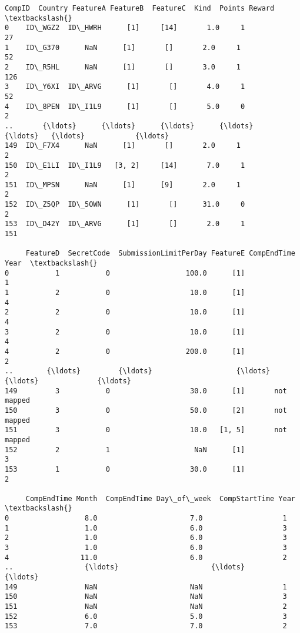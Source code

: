 \documentclass{report}
\makeatletter
\newcommand{\boxspacing}{\kern\kvtcb@left@rule\kern\kvtcb@boxsep}
\newcommand{\prompt}[4]{
        \ttfamily\llap{{\color{#2}[#3]:\hspace{3pt}#4}}\vspace{-\baselineskip}
    }
\makeatother
\begin{document}
            \begin{tcolorbox}[breakable, size=fbox, boxrule=.5pt, pad at break*=1mm, opacityfill=0]
\prompt{Out}{outcolor}{156}{\boxspacing}
\begin{Verbatim}[commandchars=\\\{\}]
      CompID  Country FeatureA FeatureB  FeatureC  Kind  Points Reward  \textbackslash{}
0    ID\_WGZ2  ID\_HWRH      [1]     [14]       1.0     1             27
1    ID\_G370      NaN      [1]       []       2.0     1             52
2    ID\_R5HL      NaN      [1]       []       3.0     1            126
3    ID\_Y6XI  ID\_ARVG      [1]       []       4.0     1             52
4    ID\_8PEN  ID\_I1L9      [1]       []       5.0     0              2
..       {\ldots}      {\ldots}      {\ldots}      {\ldots}       {\ldots}   {\ldots}            {\ldots}
149  ID\_F7X4      NaN      [1]       []       2.0     1              2
150  ID\_E1LI  ID\_I1L9   [3, 2]     [14]       7.0     1              2
151  ID\_MPSN      NaN      [1]      [9]       2.0     1              2
152  ID\_Z5QP  ID\_5OWN      [1]       []      31.0     0              2
153  ID\_D42Y  ID\_ARVG      [1]       []       2.0     1            151

     FeatureD  SecretCode  SubmissionLimitPerDay FeatureE CompEndTime Year  \textbackslash{}
0           1           0                  100.0      [1]                1
1           2           0                   10.0      [1]                4
2           2           0                   10.0      [1]                4
3           2           0                   10.0      [1]                4
4           2           0                  200.0      [1]                2
..        {\ldots}         {\ldots}                    {\ldots}      {\ldots}              {\ldots}
149         3           0                   30.0      [1]       not mapped
150         3           0                   50.0      [2]       not mapped
151         3           0                   10.0   [1, 5]       not mapped
152         2           1                    NaN      [1]                3
153         1           0                   30.0      [1]                2

     CompEndTime Month  CompEndTime Day\_of\_week  CompStartTime Year  \textbackslash{}
0                  8.0                      7.0                   1
1                  1.0                      6.0                   3
2                  1.0                      6.0                   3
3                  1.0                      6.0                   3
4                 11.0                      6.0                   2
..                 {\ldots}                      {\ldots}                 {\ldots}
149                NaN                      NaN                   1
150                NaN                      NaN                   3
151                NaN                      NaN                   2
152                6.0                      5.0                   3
153                7.0                      7.0                   2


\end{Verbatim}
\end{tcolorbox}
\end{document}
